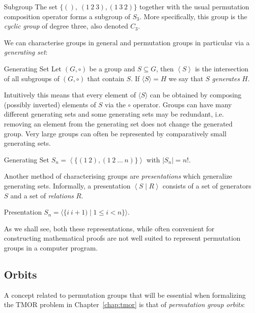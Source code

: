 \begin{exmp}{Subgroup}
  The set $\{(),\ (1\ 2\ 3), (1\ 3\ 2)\}$ together with the usual permutation
  composition operator forms a subgroup of $S_3$. More specifically, this group
  is the \textit{cyclic group} of degree three, also denoted $C_3$.
\end{exmp}
%
We can characterise groups in general and permutation groups in particular via
a \textit{generating set}:

\begin{defn}[label=defn:generating_set]{Generating Set}
  Let $(G, \circ)$ be a group and $S \subseteq G$, then $\left<S\right>$ is the
  intersection of all subgroups of $(G, \circ)$ that contain $S$. If
  $\langle S \rangle = H$ we say that $S$ \textit{generates} $H$.
\end{defn}
%
Intuitively this means that every element of $\langle S \rangle$ can be
obtained by composing (possibly inverted) elements of $S$ via the $\circ$
operator. Groups can have many different generating sets and some generating
sets may be redundant, i.e.  removing an element from the generating set does
not change the generated group. Very large groups can often be represented by
comparatively small generating sets.

\begin{exmp}{Generating Set}
  $S_n = \left<\{(1\ 2), (1\ 2\ \dots\ n)\}\right>$ with $|S_n| = n!$.
\end{exmp}
%
Another method of characterising groups are \textit{presentations} which
generalize generating sets. Informally, a presentation $\left<S \mid R\right>$
consists of a set of generators $S$ and a set of \textit{relations} $R$.

\begin{exmp}{Presentation}
  $S_n = \langle\{i\ i{+}1) \mid 1 \leq i < n\}\rangle$.
\end{exmp}
%
As we shall see, both these representations, while often convenient for
constructing mathematical proofs are not well suited to represent permutation
groups in a computer program.

\subsection{Orbits}
\label{subsec:pg_orbits}

A concept related to permutation groups that will be essential when formalizing
the TMOR problem in Chapter~\ref{chap:tmor} is that of \textit{permutation
group orbits}:

